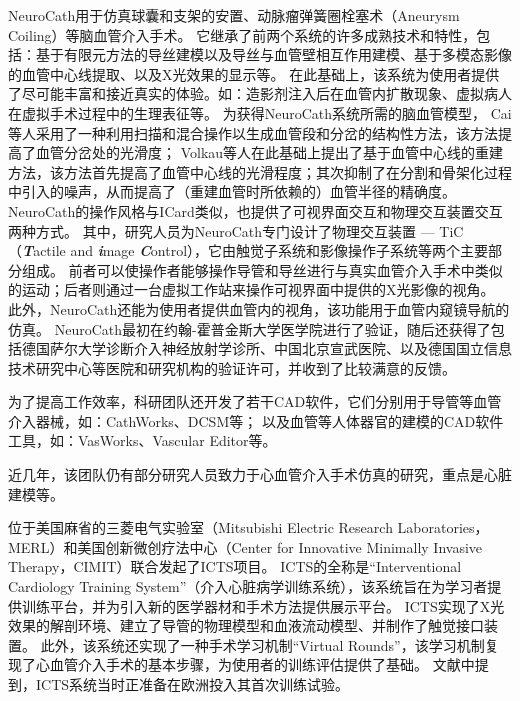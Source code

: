 NeuroCath用于仿真球囊和支架的安置、动脉瘤弹簧圈栓塞术（Aneurysm Coiling）等脑血管介入手术。
它继承了前两个系统的许多成熟技术和特性，包括：基于有限元方法的导丝建模以及导丝与血管壁相互作用建模\cite{Wang1996daVinci}\cite{Chui1996daVinci}、基于多模态影像的血管中心线提取\cite{Wang1998ICard}、以及X光效果的显示\cite{Wang1998aICard}\cite{Wang1998ICard}等。
在此基础上，该系统为使用者提供了尽可能丰富和接近真实的体验。如：造影剂注入后在血管内扩散现象、虚拟病人在虚拟手术过程中的生理表征等。
为获得NeuroCath系统所需的脑血管模型，
Cai等人\cite{Ye2002Vessel}\cite{Cai2003aVessel}\cite{Cai2003Vessel}采用了一种利用扫描和混合操作以生成血管段和分岔的结构性方法，该方法提高了血管分岔处的光滑度；
Volkau等人\cite{Volkau2005Vessel}\cite{Volkau2008Vessel}在此基础上提出了基于血管中心线的重建方法，该方法首先提高了血管中心线的光滑程度；其次抑制了在分割和骨架化过程中引入的噪声，从而提高了（重建血管时所依赖的）血管半径的精确度。
NeuroCath的操作风格与ICard类似，也提供了可视界面交互和物理交互装置交互两种方式\cite{Nowinski2001NeuroCath}。
其中，研究人员为NeuroCath专门设计了物理交互装置 --- TiC（\textbf{\textit{T}}actile and \textbf{\textit{i}}mage \textbf{\textit{C}}ontrol）\cite{Chui1999TiC}\cite{Ma1999TiC}，它由触觉子系统和影像操作子系统等两个主要部分组成。
前者可以使操作者能够操作导管和导丝进行与真实血管介入手术中类似的运动；后者则通过一台虚拟工作站来操作可视界面中提供的X光影像的视角。
此外，NeuroCath还能为使用者提供血管内的视角，该功能用于血管内窥镜导航的仿真\cite{Nowinski2001NeuroCath}。
NeuroCath最初在约翰-霍普金斯大学医学院进行了验证，随后还获得了包括德国萨尔大学诊断介入神经放射学诊所、中国北京宣武医院、以及德国国立信息技术研究中心等医院和研究机构的验证许可，并收到了比较满意的反馈\cite{Ma2007NeuroCath}。

为了提高工作效率，科研团队还开发了若干CAD软件，它们分别用于导管等血管介入器械，如：CathWorks\cite{Cai1998CathWorks}\cite{Cai2000CathWorks}、DCSM\cite{Li2001DCSM}等； 以及血管等人体器官的建模的CAD软件工具，如：VasWorks\cite{Cai2003Vessel}、Vascular Editor\cite{Ma2007NeuroCath}等。

近几年，该团队仍有部分研究人员致力于心血管介入手术仿真的研究，重点是心脏建模\cite{Chiang2011}\cite{Chiang2012}等。

位于美国麻省的三菱电气实验室（Mitsubishi Electric Research Laboratories，MERL）\cite{merlweb}和美国创新微创疗法中心（Center for Innovative Minimally Invasive Therapy，CIMIT）\cite{cimitweb}联合发起了ICTS项目\cite{Dawson2000ICTS}\cite{Cotin2000ICTS}\cite{Shaffer1999ICTS}。
ICTS的全称是“Interventional Cardiology Training System”（介入心脏病学训练系统），该系统旨在为学习者提供训练平台，并为引入新的医学器材和手术方法提供展示平台\cite{Cotin2000ICTS}。
ICTS实现了X光效果的解剖环境、建立了导管的物理模型和血液流动模型、并制作了触觉接口装置\cite{Cotin2000ICTS}。
此外，该系统还实现了一种手术学习机制“Virtual Rounds”\cite{Shaffer1999ICTS}，该学习机制复现了心血管介入手术的基本步骤，为使用者的训练评估提供了基础。
文献\cite{Dawson2000ICTS}中提到，ICTS系统当时正准备在欧洲投入其首次训练试验。

